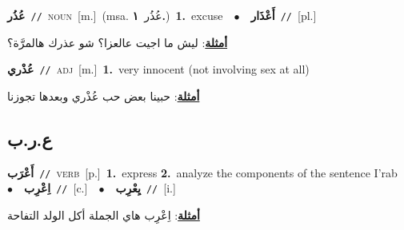 \documentclass[10pt,a4paper,twoside]{article} %
\begin{document}
\begin{multicols}{2}
{\setlength\topsep{0pt}\textbf{\foreignlanguage{arabic}{عُذُر}}\ {\color{gray}\texttt{//}\color{black}}\ \textsc{noun}\ [m.]\ \color{gray}(msa. \foreignlanguage{arabic}{عُذُر}~\foreignlanguage{arabic}{\textbf{١.}})\color{black}\ \textbf{1.}~excuse\ \ $\bullet$\ \ \setlength\topsep{0pt}\textbf{\foreignlanguage{arabic}{أَعْذَار}}\ {\color{gray}\texttt{//}\color{black}}\ [pl.]\  \begin{flushright}\color{gray}\foreignlanguage{arabic}{\textbf{\underline{\foreignlanguage{arabic}{أمثلة}}}: ليش ما اجيت عالعزا؟ شو عذرك هالمرَّة؟}\end{flushright}\color{black}} \vspace{2mm}

{\setlength\topsep{0pt}\textbf{\foreignlanguage{arabic}{عُذْري}}\ {\color{gray}\texttt{//}\color{black}}\ \textsc{adj}\ [m.]\ \textbf{1.}~very innocent (not involving sex at all)\  \begin{flushright}\color{gray}\foreignlanguage{arabic}{\textbf{\underline{\foreignlanguage{arabic}{أمثلة}}}: حبينا بعض حب عُذْري وبعدها تجوزنا}\end{flushright}\color{black}} \vspace{2mm}

\vspace{-3mm}
\subsection*{\color{blue}\foreignlanguage{arabic}{ع.ر.ب}\color{blue}{}} 

{\setlength\topsep{0pt}\textbf{\foreignlanguage{arabic}{أَعْرَب}}\ {\color{gray}\texttt{//}\color{black}}\ \textsc{verb}\ [p.]\ \textbf{1.}~express  \textbf{2.}~analyze the components of the sentence I'rab\ \ $\bullet$\ \ \setlength\topsep{0pt}\textbf{\foreignlanguage{arabic}{اِعْرِب}}\ {\color{gray}\texttt{//}\color{black}}\ [c.]\ \ $\bullet$\ \ \setlength\topsep{0pt}\textbf{\foreignlanguage{arabic}{يِعْرِب}}\ {\color{gray}\texttt{//}\color{black}}\ [i.]\  \begin{flushright}\color{gray}\foreignlanguage{arabic}{\textbf{\underline{\foreignlanguage{arabic}{أمثلة}}}: اِعْرِب هاي الجملة أكل الولد التفاحة}\end{flushright}\color{black}} \vspace{2mm}


\end{multicols}
\end{document}
